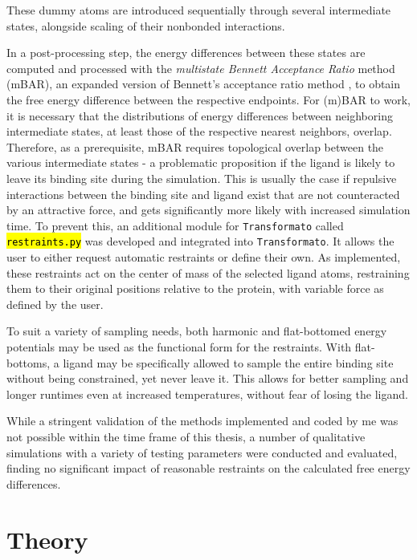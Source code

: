 \documentclass[oneside]{scrreprt}
\newcommand{\code}[1]{\texttt{\hl{#1}}}
\begin{document}
These dummy atoms are introduced sequentially through several intermediate states, alongside scaling of their nonbonded interactions.

In a post-processing step, the energy differences between these states are computed and processed with the \emph{multistate Bennett Acceptance Ratio}\cite{shirts_statistically_2008} method (mBAR), an expanded version of Bennett's acceptance ratio method \cite{Bennett1976Oct}, to obtain the free energy difference between the respective endpoints. For (m)BAR to work, it is necessary that the distributions of energy differences between neighboring intermediate states, at least those of the respective nearest neighbors, overlap. Therefore, as a prerequisite, mBAR requires topological overlap between the various intermediate states - a problematic proposition if the ligand is likely to leave its binding site during the simulation. This is usually the case if repulsive interactions between the binding site and ligand exist that are not counteracted by an attractive force, and gets significantly more likely with increased simulation time. To prevent this, an additional module for \texttt{Transformato} called \code{restraints.py} was developed and integrated into \texttt{Transformato}. It allows the user to either request automatic restraints or define their own.  As implemented, these restraints act on the center of mass of the selected ligand atoms, restraining them to their original positions relative to the protein, with variable force as defined by the user.

To suit a variety of sampling needs, both harmonic and flat-bottomed energy potentials may be used as the functional form for the restraints. With flat-bottoms, a ligand may be specifically allowed to sample the entire binding site without being constrained, yet never leave it. This allows for better sampling and longer runtimes even at increased temperatures, without fear of losing the ligand.

While a stringent validation of the methods implemented and coded by me was not possible within the time frame of this thesis, a number of qualitative simulations with a variety of testing parameters were conducted and evaluated, finding no significant impact of reasonable restraints on the calculated free energy differences.
\chapter{Theory}
\end{document}
